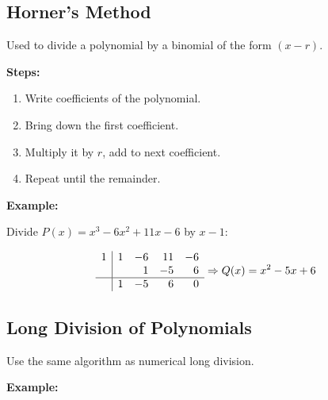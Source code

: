 \subsection{Horner’s Method}

Used to divide a polynomial by a binomial of the form \((x - r)\).
\vspace{\baselineskip}

\textbf{Steps:}
\begin{enumerate}
    \item Write coefficients of the polynomial.
    \item Bring down the first coefficient.
    \item Multiply it by \(r\), add to next coefficient.
    \item Repeat until the remainder.
\end{enumerate}

\textbf{Example:}
\vspace{\baselineskip}

Divide \(P(x) = x^3 - 6x^2 + 11x - 6\) by \(x - 1\):

\[
\begin{array}{r|rrrr}
1 & 1 & -6 & 11 & -6 \\
  &   & 1 & -5 & 6 \\
\hline
  & 1 & -5 & 6 & 0 \\
\end{array}
\Rightarrow Q(x) = x^2 - 5x + 6
\]

\subsection{Long Division of Polynomials}

Use the same algorithm as numerical long division.
\vspace{\baselineskip}

\textbf{Example:}

\bigskip
{}
